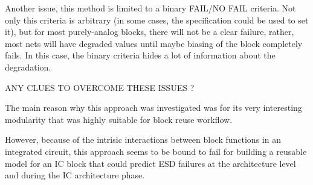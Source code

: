 Another issue, this method is limited to a binary FAIL/NO FAIL criteria.
Not only this criteria is arbitrary (in some cases, the specification could be used to set it), but
for most purely-analog blocks, there will not be a clear failure, rather, most
nets will have degraded values until maybe biasing of the block completely fails.
In this case, the binary criteria hides a lot of information about the degradation.

ANY CLUES TO OVERCOME THESE ISSUES ?

The main reason why this approach was investigated was for its very interesting modularity
that was highly suitable for block reuse workflow.

However, because of the intrisic interactions between block functions in an integrated circuit,
this approach seems to be bound to fail for building a reusable model for an IC block that could predict
ESD failures at the architecture level and during the IC architecture phase.
